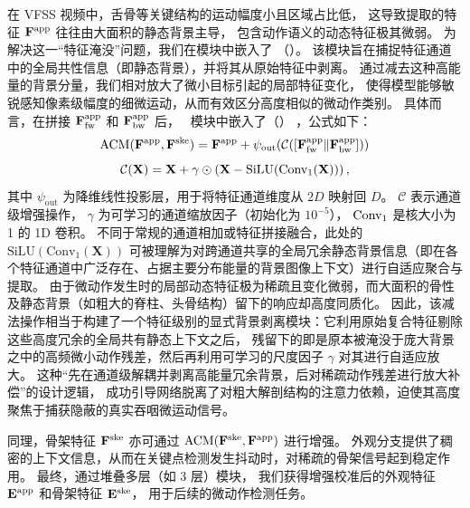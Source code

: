 在 VFSS 视频中，舌骨等关键结构的运动幅度小且区域占比低，
这导致提取的特征 \(\mathbf{F}^{\text{app}}\) 往往由大面积的静态背景主导，
包含动作语义的动态特征极其微弱。
为解决这一“特征淹没”问题，我们在模块中嵌入了 \channelblockfull（\channelblockshort）。
该模块旨在捕捉特征通道中的全局共性信息（即静态背景），并将其从原始特征中剥离。
通过减去这种高能量的背景分量，我们相对放大了微小目标引起的局部特征变化，
使得模型能够敏锐感知像素级幅度的细微运动，从而有效区分高度相似的微动作类别。
具体而言，在拼接 \(\mathbf{F}^{\text{app}}_{\text{fw}}\) 和 \(\mathbf{F}^{\text{app}}_{\text{bw}}\) 后，
~\crossblockshort 模块中嵌入了\channelblockfull（\channelblockshort） ，公式如下：
\begin{equation}
\begin{aligned}\label{eq: ccm}
    {\rm \crossblockshort}(\vect{F}^{\text{app}},\vect{F}^{\text{ske}})=\vect{F}^{\text{app}}+\psi_{\text{out}}(\mathcal{C}([\vect{F}^{\text{app}}_{\text{fw}}\|\vect{F}^{\text{app}}_{\text{bw}}]))
\end{aligned}
\end{equation}
\begin{equation}\label{eq: ce}
    \mathcal{C}(\mathbf{X})=\mathbf{X}+\gamma\odot\left(\mathbf{X}-{\rm SiLU}({\rm Conv_{1}(\mathbf{X})})\right),
\end{equation}
其中 \( \psi_{\text{out}} \) 为降维线性投影层，用于将特征通道维度从 \(2D\) 映射回 \(D\)。
\( \mathcal{C} \) 表示通道级增强操作，
\( \gamma \) 为可学习的通道缩放因子（初始化为 \(10^{-5}\)），
\( {\rm Conv_1} \) 是核大小为 1 的 1D 卷积。
不同于常规的通道相加或特征拼接融合，此处的 \(\mathrm{SiLU}(\mathrm{Conv}_1(\mathbf{X}))\) 
可被理解为对跨通道共享的全局冗余静态背景信息（即在各个特征通道中广泛存在、占据主要分布能量的背景图像上下文）进行自适应聚合与提取。
由于微动作发生时的局部动态特征极为稀疏且变化微弱，而大面积的骨性及静态背景（如粗大的脊柱、头骨结构）留下的响应却高度同质化。
因此，该减法操作相当于构建了一个特征级别的显式背景剥离模块：它利用原始复合特征剔除这些高度冗余的全局共有静态上下文之后，
残留下的即是原本被淹没于庞大背景之中的高频微小动作残差，然后再利用可学习的尺度因子 \(\gamma\) 对其进行自适应放大。
这种“先在通道级解耦并剥离高能量冗余背景，后对稀疏动作残差进行放大补偿”的设计逻辑，
成功引导网络脱离了对粗大解剖结构的注意力依赖，迫使其高度聚焦于捕获隐蔽的真实吞咽微运动信号。

同理，骨架特征 \(\mathbf{F}^{\text{ske}}\) 亦可通过 
\({\rm \crossblockshort}(\vect{F}^{\text{ske}}, \vect{F}^{\text{app}})\) 进行增强。
外观分支提供了稠密的上下文信息，从而在关键点检测发生抖动时，对稀疏的骨架信号起到稳定作用。
最终，通过堆叠多层（如 3 层）\crossblockshort 模块，
我们获得增强校准后的外观特征 \(\mathbf{E}^{\text{app}}\) 和骨架特征 \(\mathbf{E}^{\text{ske}}\)，
用于后续的微动作检测任务。


